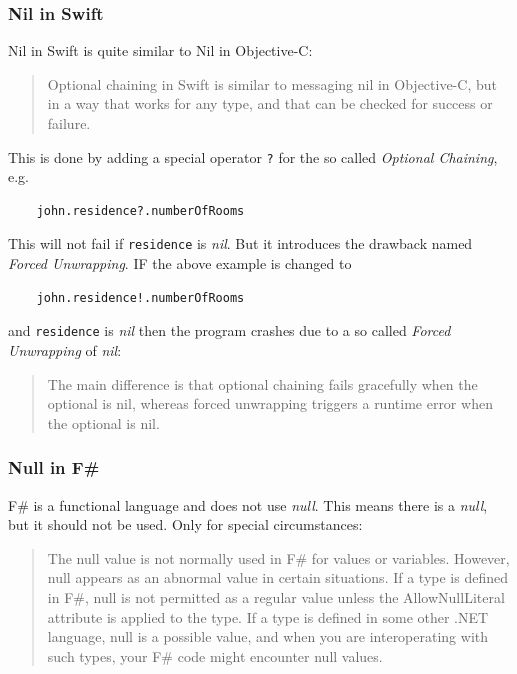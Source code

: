 \documentclass[12pt,a4paper]{report}
\begin{document}
\subsubsection{Nil in Swift}

Nil in Swift is quite similar to Nil in Objective-C:\@

\begin{quotation}
    Optional chaining in Swift is similar to messaging nil in Objective-C, but in a way that works for any type, and that can be checked for success or failure.\cite{swift-spec-optional-chaining}
\end{quotation}

This is done by adding a special operator \texttt{?} for the so called \textit{Optional Chaining}, e.g.

\begin{verbatim}
    john.residence?.numberOfRooms
\end{verbatim}

This will not fail if \texttt{residence} is \textit{nil}. But it introduces the drawback named \textit{Forced Unwrapping}. IF the above example is changed to

\begin{verbatim}
    john.residence!.numberOfRooms
\end{verbatim}

and \texttt{residence} is \textit{nil} then the program crashes due to a so called \textit{Forced Unwrapping} of \textit{nil}:

\begin{quotation}
    The main difference is that optional chaining fails gracefully when the optional is nil, whereas forced unwrapping triggers a runtime error when the optional is nil.\cite{swift-spec-optional-chaining}
\end{quotation}

\subsubsection{Null in F\#}

F\# is a functional language and does not use \textit{null}. This means there is a \textit{null}, but it should not be used. Only for special circumstances:

\begin{quotation}
    The null value is not normally used in F\# for values or variables. However, null appears as an abnormal value in certain situations. If a type is defined in F\#, null is not permitted as a regular value unless the AllowNullLiteral attribute is applied to the type. If a type is defined in some other .NET language, null is a possible value, and when you are interoperating with such types, your F\# code might encounter null values.\cite{null-in-fsharp}
\end{quotation}
\end{document}
